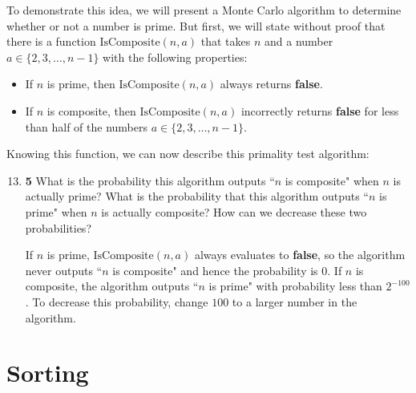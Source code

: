 \documentclass[12pt]{article}
\theoremstyle{plain}
\theoremstyle{definition}
\theoremstyle{remark}
\newcommand{\pts}[1]{\lbrack\textbf{#1}\rbrack}
\begin{document}
To demonstrate this idea, we will present a Monte Carlo algorithm to determine whether or not a number is prime. But first, we will state without proof that there is a function $\text{IsComposite}(n,a)$ that takes $n$ and a number $a\in\{2,3,\dots,n-1\}$ with the following properties:

\begin{itemize}
\item If $n$ is prime, then $\text{IsComposite}(n,a)$ always returns \textbf{false}.

\item If $n$ is composite, then $\text{IsComposite}(n,a)$ incorrectly returns \textbf{false} for less than half of the numbers $a\in\{2,3,\dots,n-1\}$.
\end{itemize}

Knowing this function, we can now describe this primality test algorithm:

\begin{algorithm}
\DontPrintSemicolon
{}
\end{algorithm}

\vspace{-10pt}

\begin{enumerate}
\setcounter{enumi}{12}

\item \pts{5} What is the probability this algorithm outputs ``$n$ is composite" when $n$ is actually prime? What is the probability that this algorithm outputs ``$n$ is prime" when $n$ is actually composite? How can we decrease these two probabilities?

\begin{tcolorbox}
If $n$ is prime, $\text{IsComposite}(n,a)$ always evaluates to \textbf{false}, so the algorithm never outputs ``$n$ is composite" and hence the probability is $0$.  If $n$ is composite, the algorithm outputs ``$n$ is prime" with probability less than $2^{-100}$. To decrease this probability, change $100$ to a larger number in the algorithm.
\end{tcolorbox}
\end{enumerate}

\section{Sorting}
\end{document}
